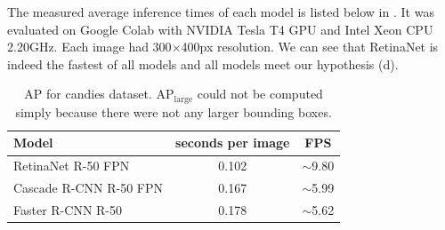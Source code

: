 The measured average inference times of each model is listed below in
. It was evaluated on Google Colab with NVIDIA Tesla T4
GPU and Intel Xeon CPU 2.20GHz. Each image had 300$\times$400px resolution. We
can see that RetinaNet is indeed the fastest of all models and all models meet
our hypothesis (d).


\begin{table}[H]
	\centering
	\begin{tabular}{l|c|c}
		Model                  & seconds per image & FPS                               \\
		\hline
		RetinaNet R-50 FPN     & 0.102             & \scriptsize $\sim$\normalsize9.80 \\
		Cascade R-CNN R-50 FPN & 0.167             & \scriptsize $\sim$\normalsize5.99 \\
		Faster R-CNN R-50      & 0.178             & \scriptsize $\sim$\normalsize5.62 \\
	\end{tabular}
	\caption{AP for candies dataset. AP$_\text{large}$ could not be computed
		simply because there were not any larger bounding boxes.}
	\label{tab:candies_time}
\end{table}


